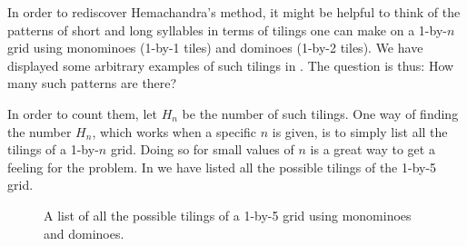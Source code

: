 In order to rediscover Hemachandra's method, it might be helpful to think of the patterns of short and long syllables in terms of tilings one can make on a 1-by-$n$ grid using monominoes (1-by-1 tiles) and dominoes (1-by-2 tiles). We have displayed some arbitrary examples of such tilings in . The question is thus: How many such patterns are there?

In order to count them, let $H_n$ be the number of such tilings. One way of finding the number $H_n$, which works when a specific $n$ is given, is to simply list all the tilings of a 1-by-$n$ grid. Doing so for small values of $n$ is a great way to get a feeling for the problem. In  we have listed all the possible tilings of the 1-by-5 grid.

\begin{figure}[t]
  \centering
  \caption[Hemachandra tilings of a 1-by-5 grid]{\label{figure:complete-fifth-fibonacci-tiling}A list of all the possible tilings of a 1-by-5 grid using monominoes and dominoes.}
\end{figure}

